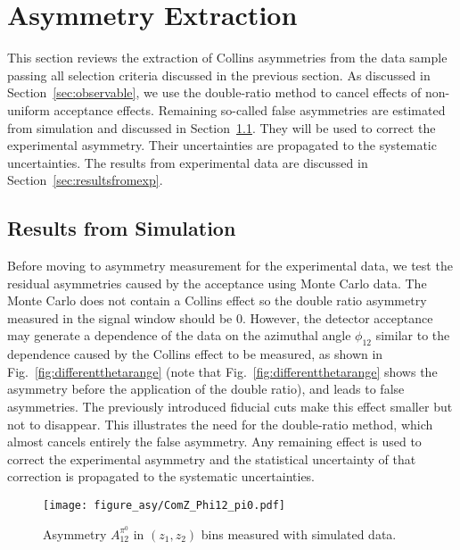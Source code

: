 \section{Asymmetry Extraction}
 
 This section reviews the extraction of Collins asymmetries from the data sample passing all selection criteria discussed in the previous section.
As discussed in Section~\ref{sec:observable}, we use the double-ratio method to cancel effects of non-uniform acceptance effects.
Remaining so-called false asymmetries are estimated from simulation and discussed in Section~\ref{sec:resutlsfrommc}. 
They will be used to correct the experimental asymmetry.  Their uncertainties are propagated to the systematic uncertainties.
The results from experimental data are discussed in Section~\ref{sec:resultsfromexp}.

\subsection{Results from Simulation}
\label{sec:resutlsfrommc}
Before moving to asymmetry measurement for the experimental data, we test the residual asymmetries caused by the acceptance using  Monte Carlo data. The Monte Carlo does not contain a Collins effect  so the double ratio asymmetry measured in the signal window should be 0. However, the detector acceptance may generate a dependence of the data on the azimuthal angle $\phi_{12}$ similar to the dependence caused by the Collins effect to be measured, as shown in Fig.~\ref{fig:differentthetarange} (note that  Fig.~\ref{fig:differentthetarange} shows the asymmetry before the application of the double ratio), and leads to false asymmetries. The previously introduced fiducial cuts make this effect smaller but  not to disappear.
This illustrates the need for the double-ratio method, which almost cancels entirely the false asymmetry. Any remaining effect 
is used to correct the experimental asymmetry and the statistical uncertainty of that correction is propagated to the systematic uncertainties.

\begin{figure}[b]
    \centering
    \texttt{[image: figure\_asy/ComZ\_Phi12\_pi0.pdf]}
    \caption{Asymmetry $A_{12}^{\pi^0}$ in  $(z_1,z_{2})$ bins measured with simulated data.}
    \label{fig:mc_example}
\end{figure}

